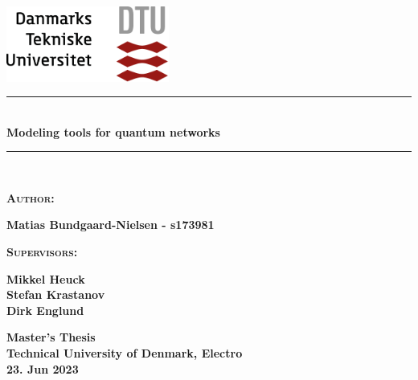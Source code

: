 
\begin{titlepage}
\begin{center}
\vspace{2cm}
\includegraphics[width=0.4\textwidth]{root/dtu.png}~\\[1cm]
\vspace{2cm}

\vspace{2cm}

\rule{\textwidth}{1mm}\\
\vspace{.5cm}
{ \huge \bfseries Modeling tools for quantum networks}
\vspace{.5cm}

\rule{\textwidth}{1mm}\\
\vspace{1.5cm}

\textsc{\textbf{Author:}}\\
\vspace{.3cm}
\centering

\textbf{Matias Bundgaard-Nielsen - s173981}\\

\vspace{1cm}

\textsc{\textbf{Supervisors:}}\\
\vspace{.3cm}
\centering

\textbf{Mikkel Heuck} \\
\textbf{Stefan Krastanov}\\
\textbf{Dirk Englund}

\normalsize

\begin{flushleft}
\textbf{Master's Thesis}\\
\textbf{Technical University of Denmark, Electro}\\
\textbf{23. Jun 2023}
\end{flushleft}

\end{center}
\end{titlepage}